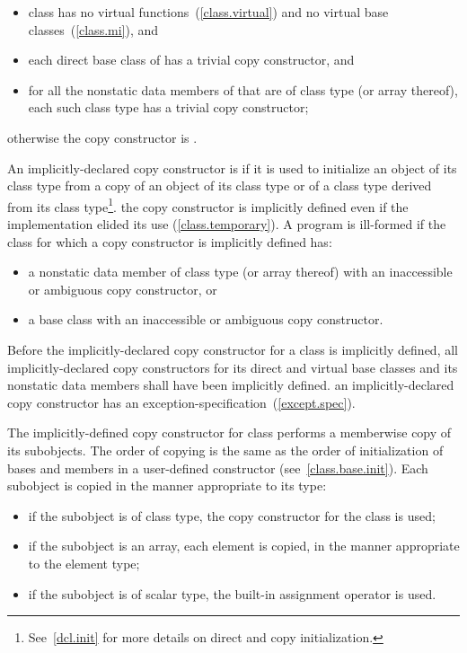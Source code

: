 \begin{itemize}
\item
class
has no virtual functions~(\ref{class.virtual})
and no virtual base classes~(\ref{class.mi}), and

\item
each direct base class of  has a trivial copy constructor, and

\item
for all the nonstatic data members of
that are of class type (or array thereof), each such class type has a
trivial copy constructor;
\end{itemize}

otherwise the copy constructor is
.

\pnum
{}%
An implicitly-declared copy constructor is
if it is used to initialize an object of its class type from a copy of an
object of its class type or of a class type derived from its class
type\footnote{See~\ref{dcl.init} for more details on direct and copy
initialization.}.
\enternote
the copy constructor is implicitly defined even if the implementation elided
its use (\ref{class.temporary}).
\exitnote
A program is ill-formed if the class for which a copy constructor is
implicitly defined has:

\begin{itemize}
\item a nonstatic data member of class type (or array thereof) with an
inaccessible or ambiguous copy constructor, or
\item a base class with an inaccessible or ambiguous copy constructor.
\end{itemize}

Before the implicitly-declared copy constructor for a class is
implicitly defined,
all implicitly-declared copy constructors for its direct and
virtual base classes and its nonstatic data members
shall have been implicitly defined.
\enternote
an implicitly-declared copy constructor has an
exception-specification~(\ref{except.spec}).
\exitnote

\pnum
The implicitly-defined copy constructor for class
performs a memberwise copy of its subobjects.
The order of copying is the same as the order of initialization of bases
and members in a user-defined constructor (see~\ref{class.base.init}).
Each subobject is copied in the manner appropriate to its type:

\begin{itemize}
\item
if the subobject is of class type, the copy constructor for the class is used;

\item
if the subobject is an array, each element is
copied, in the manner appropriate to the element type;

\item
if the subobject is of scalar type, the built-in assignment operator is used.
\end{itemize}

